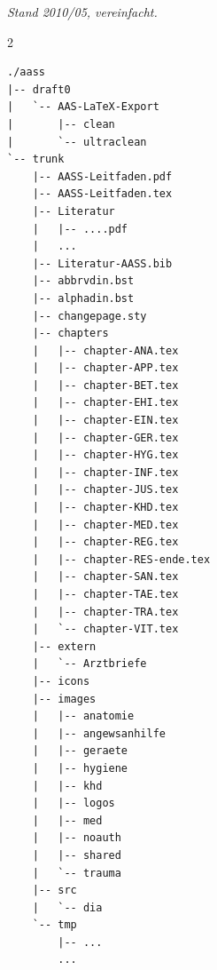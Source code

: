 \documentclass[ngerman,paper=a4,fontsize=8pt,headings=small,draft=no,parskip=half,noonelinecaption]{scrreprt}
\begin{document}
\begin{minipage}{\linewidth}
\emph{Stand 2010/05, vereinfacht.}
\begin{multicols}{2}


{\small
\begin{verbatim}
./aass
|-- draft0
|   `-- AAS-LaTeX-Export
|       |-- clean
|       `-- ultraclean
`-- trunk
    |-- AASS-Leitfaden.pdf
    |-- AASS-Leitfaden.tex
    |-- Literatur
    |   |-- ....pdf
    |   ...
    |-- Literatur-AASS.bib
    |-- abbrvdin.bst
    |-- alphadin.bst
    |-- changepage.sty
    |-- chapters
    |   |-- chapter-ANA.tex
    |   |-- chapter-APP.tex
    |   |-- chapter-BET.tex
    |   |-- chapter-EHI.tex
    |   |-- chapter-EIN.tex
    |   |-- chapter-GER.tex
    |   |-- chapter-HYG.tex
    |   |-- chapter-INF.tex
    |   |-- chapter-JUS.tex
    |   |-- chapter-KHD.tex
    |   |-- chapter-MED.tex
    |   |-- chapter-REG.tex
    |   |-- chapter-RES-ende.tex
    |   |-- chapter-SAN.tex
    |   |-- chapter-TAE.tex
    |   |-- chapter-TRA.tex
    |   `-- chapter-VIT.tex
    |-- extern
    |   `-- Arztbriefe
    |-- icons
    |-- images
    |   |-- anatomie
    |   |-- angewsanhilfe
    |   |-- geraete
    |   |-- hygiene
    |   |-- khd
    |   |-- logos
    |   |-- med
    |   |-- noauth
    |   |-- shared
    |   `-- trauma
    |-- src
    |   `-- dia
    `-- tmp
        |-- ...
        ...
\end{verbatim}
}
\end{multicols}
\end{minipage}
\end{document}
